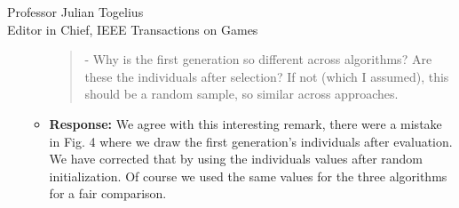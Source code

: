 \documentclass[10pt]{letter} %
\begin{document}
\begin{letter}{Professor Julian Togelius \\ Editor in Chief, IEEE Transactions on Games}
\begin{enumerate}
\begin{itemize}
				\begin{quote}	
					- Why is the first generation so different across algorithms? Are these the individuals after selection? If not (which I assumed), this should be a random sample, so similar across approaches.
				\end{quote}	
			\item {\bf Response:} 
			We agree with this interesting remark, there
                        were a mistake in Fig. 4 where we draw the
                        first generation's individuals after
                        evaluation. We have corrected that by using
                        the individuals values after random
                        initialization. Of course we used the same
                        values for the three algorithms for a fair
                        comparison.


\end{itemize}
\end{enumerate}
\end{letter}
\end{document}
